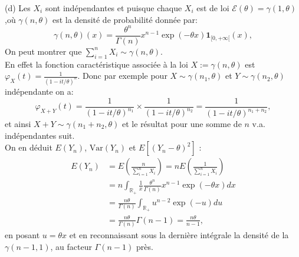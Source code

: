 {\begin{enumerate}
{(d) Les $X_i$ sont indépendantes et puisque chaque $X_i$ est de loi $\mathcal{E}(\theta) = \gamma(1, \theta)$,où $\gamma(n,\theta)$ est la densité de probabilité donnée par:
$$
\gamma(n,\theta)(x) = \frac{\theta^n}{\Gamma(n)} x^{n-1} \exp(-\theta x)\mathbf{1}_{[0,+\infty[}(x),
$$
On peut montrer que $\sum_{i=1}^n X_i \sim \gamma(n, \theta)$.\\
En effet la fonction caractéristique associée à la loi $X:=\gamma(n,\theta)$ est $\varphi_{X}(t)=\frac{1}{(1-it/\theta)^{n}}$. Donc par exemple pour $X \sim \gamma(n_1,\theta)$ et  $Y \sim \gamma(n_2,\theta)$ indépendante on a:
$$\varphi_{X+Y}(t)=\frac{1}{(1-it/\theta)^{n_1}}\times \frac{1}{(1-it/\theta)^{n_2}}=\frac{1}{(1-it/\theta)^{n_1+n_2}}, $$
et ainsi $X+Y \sim \gamma(n_1+n_2,\theta)$ et le résultat pour une somme de $n$ v.a. indépendantes suit.\\
On en déduit $E(Y_n)$, $\text{Var}(Y_n)$ et $E[(Y_n - \theta)^2]$ :
\begin{align*}
E(Y_n) &= E\left(\frac{n}{\sum_{i=1}^n X_i}\right) = nE\left(\frac{1}{\sum_{i=1}^n X_i}\right) \\
&= n\int_{\mathbb{R}_+} \frac{1}{x} \frac{\theta^n}{\Gamma(n)} x^{n-1}\exp(-\theta x)dx \\
&= \frac{n\theta}{\Gamma(n)}\int_{\mathbb{R}_+} u^{n-2}\exp(-u)du \\
&= \frac{n\theta}{\Gamma(n)}\Gamma(n-1) = \frac{n\theta}{n-1},
\end{align*}
en posant $u = \theta x$ et en reconnaissant sous la dernière intégrale la densité de la $\gamma(n-1, 1)$, au facteur $\Gamma(n-1)$ près.

}
\end{enumerate}}
